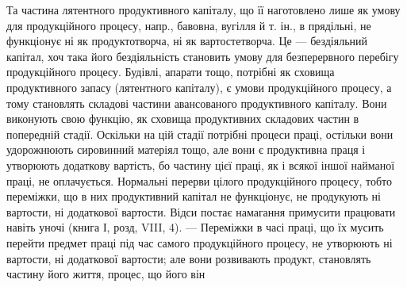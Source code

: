 Та частина лятентного продуктивного капіталу, що її наготовлено
лише як умову для продукційного процесу, напр., бавовна, вугілля й
т. ін., в прядільні, не функціонує ні як продуктотворча, ні як вартостетворча.
Це — бездіяльний капітал, хоч така його бездіяльність становить
умову для безперервного перебігу продукційного процесу. Будівлі, апарати
тощо, потрібні як сховища продуктивного запасу (лятентного капіталу),
є умови продукційного процесу, а тому становлять складові частини авансованого
продуктивного капіталу. Вони виконують свою функцію, як сховища
продуктивних складових частин в попередній стадії. Оскільки на цій стадії
потрібні процеси праці, остільки вони удорожнюють сировинний матеріял
тощо, але вони є продуктивна праця і утворюють додаткову
вартість, бо частину цієї праці, як і всякої іншої найманої праці, не
оплачується. Нормальні перерви цілого продукційного процесу, тобто
переміжки, що в них продуктивний капітал не функціонує, не продукують
ні вартости, ні додаткової вартости. Відси постає намагання примусити
працювати навіть уночі (книга І, розд, VIII, 4). — Переміжки в часі праці,
що їх мусить перейти предмет праці під час самого продукційного процесу,
не утворюють ні вартости, ні додаткової вартости; але вони розвивають
продукт, становлять частину його життя, процес, що його він
\parbreak{}  %
